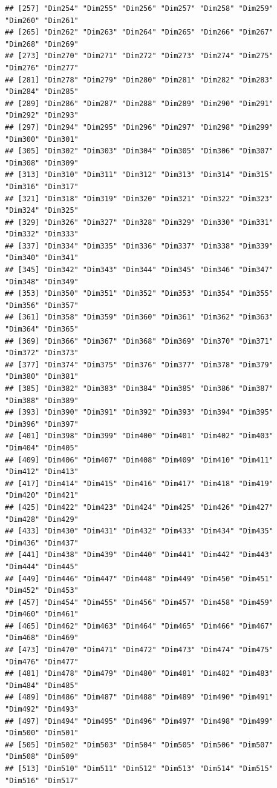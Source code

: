 \documentclass[
  english,
  man]{apa6}
\begin{document}
\begin{verbatim}
## [257] "Dim254" "Dim255" "Dim256" "Dim257" "Dim258" "Dim259" "Dim260" "Dim261"
## [265] "Dim262" "Dim263" "Dim264" "Dim265" "Dim266" "Dim267" "Dim268" "Dim269"
## [273] "Dim270" "Dim271" "Dim272" "Dim273" "Dim274" "Dim275" "Dim276" "Dim277"
## [281] "Dim278" "Dim279" "Dim280" "Dim281" "Dim282" "Dim283" "Dim284" "Dim285"
## [289] "Dim286" "Dim287" "Dim288" "Dim289" "Dim290" "Dim291" "Dim292" "Dim293"
## [297] "Dim294" "Dim295" "Dim296" "Dim297" "Dim298" "Dim299" "Dim300" "Dim301"
## [305] "Dim302" "Dim303" "Dim304" "Dim305" "Dim306" "Dim307" "Dim308" "Dim309"
## [313] "Dim310" "Dim311" "Dim312" "Dim313" "Dim314" "Dim315" "Dim316" "Dim317"
## [321] "Dim318" "Dim319" "Dim320" "Dim321" "Dim322" "Dim323" "Dim324" "Dim325"
## [329] "Dim326" "Dim327" "Dim328" "Dim329" "Dim330" "Dim331" "Dim332" "Dim333"
## [337] "Dim334" "Dim335" "Dim336" "Dim337" "Dim338" "Dim339" "Dim340" "Dim341"
## [345] "Dim342" "Dim343" "Dim344" "Dim345" "Dim346" "Dim347" "Dim348" "Dim349"
## [353] "Dim350" "Dim351" "Dim352" "Dim353" "Dim354" "Dim355" "Dim356" "Dim357"
## [361] "Dim358" "Dim359" "Dim360" "Dim361" "Dim362" "Dim363" "Dim364" "Dim365"
## [369] "Dim366" "Dim367" "Dim368" "Dim369" "Dim370" "Dim371" "Dim372" "Dim373"
## [377] "Dim374" "Dim375" "Dim376" "Dim377" "Dim378" "Dim379" "Dim380" "Dim381"
## [385] "Dim382" "Dim383" "Dim384" "Dim385" "Dim386" "Dim387" "Dim388" "Dim389"
## [393] "Dim390" "Dim391" "Dim392" "Dim393" "Dim394" "Dim395" "Dim396" "Dim397"
## [401] "Dim398" "Dim399" "Dim400" "Dim401" "Dim402" "Dim403" "Dim404" "Dim405"
## [409] "Dim406" "Dim407" "Dim408" "Dim409" "Dim410" "Dim411" "Dim412" "Dim413"
## [417] "Dim414" "Dim415" "Dim416" "Dim417" "Dim418" "Dim419" "Dim420" "Dim421"
## [425] "Dim422" "Dim423" "Dim424" "Dim425" "Dim426" "Dim427" "Dim428" "Dim429"
## [433] "Dim430" "Dim431" "Dim432" "Dim433" "Dim434" "Dim435" "Dim436" "Dim437"
## [441] "Dim438" "Dim439" "Dim440" "Dim441" "Dim442" "Dim443" "Dim444" "Dim445"
## [449] "Dim446" "Dim447" "Dim448" "Dim449" "Dim450" "Dim451" "Dim452" "Dim453"
## [457] "Dim454" "Dim455" "Dim456" "Dim457" "Dim458" "Dim459" "Dim460" "Dim461"
## [465] "Dim462" "Dim463" "Dim464" "Dim465" "Dim466" "Dim467" "Dim468" "Dim469"
## [473] "Dim470" "Dim471" "Dim472" "Dim473" "Dim474" "Dim475" "Dim476" "Dim477"
## [481] "Dim478" "Dim479" "Dim480" "Dim481" "Dim482" "Dim483" "Dim484" "Dim485"
## [489] "Dim486" "Dim487" "Dim488" "Dim489" "Dim490" "Dim491" "Dim492" "Dim493"
## [497] "Dim494" "Dim495" "Dim496" "Dim497" "Dim498" "Dim499" "Dim500" "Dim501"
## [505] "Dim502" "Dim503" "Dim504" "Dim505" "Dim506" "Dim507" "Dim508" "Dim509"
## [513] "Dim510" "Dim511" "Dim512" "Dim513" "Dim514" "Dim515" "Dim516" "Dim517"

\end{verbatim}
\end{document}
